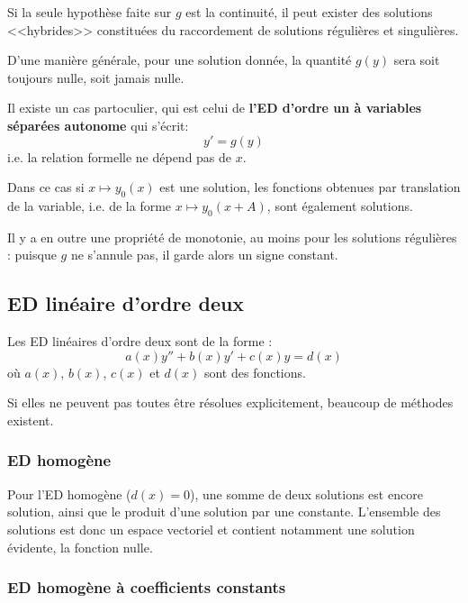Si la seule hypothèse faite sur $g$ est la continuité, il peut exister des solutions <<hybrides>> 
constituées du raccordement de solutions régulières et singulières. 

D'une manière générale, pour une solution donnée, la quantité $g(y)$ sera soit toujours nulle, 
soit jamais nulle.

\medskip
Il existe un cas partoculier, qui est celui de \textbf{l'ED d'ordre un à variables séparées autonome}
qui s'écrit:
\begin{equation}
    y' = g(y)
\end{equation}
i.e. la relation formelle ne dépend pas de $x$. 

Dans ce cas si $x \mapsto y_0(x)$ est une solution, les fonctions obtenues par translation de la variable, 
i.e. de la forme $x \mapsto y_0(x+A)$, sont également solutions. 

Il y a en outre une propriété de monotonie, au moins pour les solutions régulières : 
puisque $g$ ne s'annule pas, il garde alors un signe constant.



\medskip
\subsection{ED linéaire d'ordre deux}

Les ED linéaires d'ordre deux sont de la forme : 
\begin{equation}
a(x)y'' + b(x)y' + c(x)y = d(x)
\end{equation}
où $a(x)$, $b(x)$, $c(x)$ et $d(x)$ sont des fonctions.

Si elles ne peuvent pas toutes être résolues explicitement, beaucoup de méthodes existent.

\medskip
\subsubsection{ED homogène}

Pour l'ED homogène ($d(x)=0$), une somme de deux solutions est encore solution, ainsi que le 
produit d'une solution par une constante. 
L'ensemble des solutions est donc un espace vectoriel et contient notamment une solution évidente, 
la fonction nulle.

\medskip
\subsubsection{ED homogène à coefficients constants}

